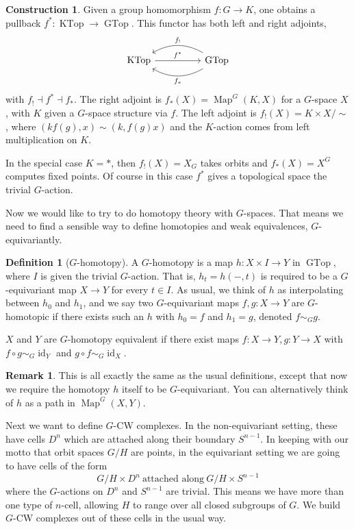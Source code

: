 \documentclass{amsart}
\theoremstyle{definition}
\newtheorem{defn}[thm]{Definition}
\newtheorem{construction}[thm]{Construction}
\newtheorem{remark}[thm]{Remark}
\numberwithin{thm}{section}
\def\Map{\operatorname{Map}}
\def\GTop{\operatorname{GTop}}
\def\KTop{\operatorname{KTop}}
\def\id{\operatorname{id}}
\begin{document}
\begin{construction}
    Given a group homomorphism $f: G \to K$, one obtains a pullback $f^*: \KTop \to \GTop$. This functor has both left and right adjoints,
    \[\begin{tikzcd}
        \KTop \arrow[rr, "f^*"] &  & \GTop \arrow[ll, "f_*", bend left] \arrow[ll, "f_!"', bend right]
        \end{tikzcd}\]
    with $f_! \dashv f^* \dashv f_*$. The right adjoint is $f_*(X) = \Map^G(K, X)$ for a $G$-space $X$, with $K$ given a $G$-space structure via $f$. The left adjoint is $f_!(X) = K \times X/ \sim$, where $(kf(g), x) \sim (k, f(g)x)$ and the $K$-action comes from left multiplication on $K$.

    In the special case $K = *$, then $f_!(X) = X_G$ takes orbits and $f_*(X) = X^G$ computes fixed points. Of course in this case $f^*$ gives a topological space the trivial $G$-action.
\end{construction}

Now we would like to try to do homotopy theory with $G$-spaces. That means we need to find a sensible way to define homotopies and weak equivalences, $G$-equivariantly.

\begin{defn}[$G$-homotopy]
    A $G$-homotopy is a map $h: X \times I \to Y$ in $\GTop$, where $I$ is given the trivial $G$-action. That is, $h_t = h(-, t)$ is required to be a $G$-equivariant map $X \to Y$ for every $t \in I$. As usual, we think of $h$ as interpolating between $h_0$ and $h_1$, and we say two $G$-equivariant maps $f, g: X \to Y$ are $G$-homotopic if there exists such an $h$ with $h_0 = f$ and $h_1 = g$, denoted $f \sim_G g$. 

    $X$ and $Y$ are $G$-homotopy equivalent if there exist maps $f: X \to Y, g: Y \to X$ with $f \circ g \sim_G \id_Y$ and $g \circ f \sim_G \id_X$.
\end{defn}

\begin{remark}
    This is all exactly the same as the usual definitions, except that now we require the homotopy $h$ itself to be $G$-equivariant. You can alternatively think of $h$ as a path in $\Map^G(X, Y)$.
\end{remark}

Next we want to define $G$-CW complexes. In the non-equivariant setting, these have cells $D^n$ which are attached along their boundary $S^{n-1}$. In keeping with our motto that orbit spaces $G/H$ are points, in the equivariant setting we are going to have cells of the form
\[G/H \times D^n ~\text{attached along}~ G/H \times S^{n-1}\]
where the $G$-actions on $D^n$ and $S^{n-1}$ are trivial. This means we have more than one type of $n$-cell, allowing $H$ to range over all closed subgroups of $G$. We build $G$-CW complexes out of these cells in the usual way. 
\end{document}
